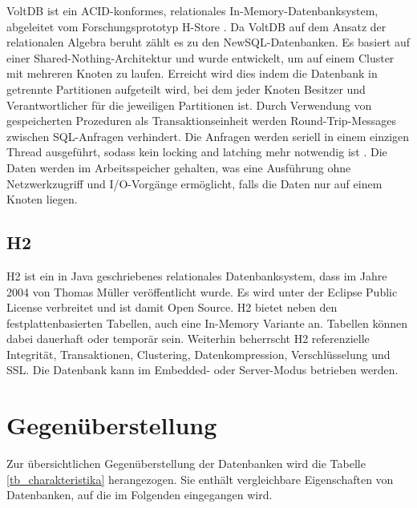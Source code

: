 VoltDB \cite{volt2013a} ist ein ACID-konformes, relationales In-Memory-Datenbanksystem, abgeleitet vom Forschungsprototyp H-Store \cite{kallman08}. Da VoltDB auf dem Ansatz der relationalen Algebra beruht zählt es zu den NewSQL-Datenbanken. Es basiert auf einer Shared-Nothing-Architektur und wurde entwickelt, um auf einem Cluster mit mehreren Knoten zu laufen. Erreicht wird dies indem die Datenbank in getrennte Partitionen aufgeteilt wird, bei dem jeder Knoten Besitzer und Verantwortlicher für die jeweiligen Partitionen ist. Durch Verwendung von gespeicherten Prozeduren als Transaktionseinheit werden Round-Trip-Messages zwischen SQL-Anfragen verhindert. Die Anfragen werden seriell in einem einzigen Thread ausgeführt, sodass kein locking and latching mehr notwendig ist \cite{volt2013b}. Die Daten werden im Arbeitsspeicher gehalten, was eine Ausführung ohne Netzwerkzugriff und I/O-Vorgänge ermöglicht, falls die Daten nur auf einem Knoten liegen.  

\subsection{H2} 
\label{ch:AnalyseDatenbanken:sec:Datenbanken:subsec:H2}

H2 ist ein in Java geschriebenes relationales Datenbanksystem, dass im Jahre 2004 von Thomas Müller veröffentlicht wurde. Es wird unter der Eclipse Public License verbreitet und ist damit Open Source. H2 bietet neben den festplattenbasierten Tabellen, auch eine In-Memory Variante an. Tabellen können dabei dauerhaft oder temporär sein. Weiterhin beherrscht H2 referenzielle Integrität, Transaktionen, Clustering, Datenkompression, Verschlüsselung und SSL. Die Datenbank kann im Embedded- oder Server-Modus betrieben werden.

\section{Gegenüberstellung} 
\label{ch:AnalyseDatenbanken:sec:Gegenüberstellung}

Zur übersichtlichen Gegenüberstellung der Datenbanken wird die Tabelle \ref{tb_charakteristika} herangezogen. Sie enthält vergleichbare Eigenschaften von Datenbanken, auf die im Folgenden eingegangen wird. 

